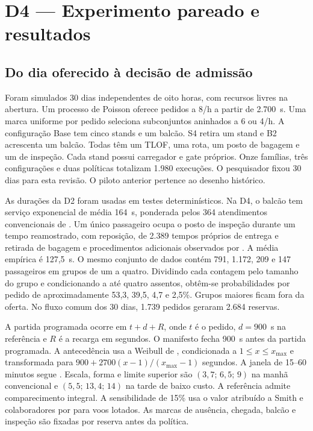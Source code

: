 \section{D4 — Experimento pareado e resultados}
\label{sec:resultados}
\subsection{Do dia oferecido à decisão de admissão}
Foram simulados 30 dias independentes de oito horas, com recursos livres na abertura. Um processo de Poisson oferece pedidos a 8/h a partir de 2.700~s. Uma marca uniforme por pedido seleciona subconjuntos aninhados a 6 ou 4/h. A configuração Base tem cinco stands e um balcão. S4 retira um stand e B2 acrescenta um balcão. Todas têm um TLOF, uma rota, um posto de bagagem e um de inspeção. Cada stand possui carregador e gate próprios. Onze famílias, três configurações e duas políticas totalizam 1.980 execuções. O pesquisador fixou 30 dias para esta revisão. O piloto anterior pertence ao desenho histórico.

As durações da D2 foram usadas em testes determinísticos. Na D4, o balcão tem serviço exponencial de média 164~s, ponderada pelos 364 atendimentos convencionais de \citet{marintseva2014}. Um único passageiro ocupa o posto de inspeção durante um tempo reamostrado, com reposição, de 2.389 tempos próprios de entrega e retirada de bagagem e procedimentos adicionais observados por \citet{janssen2020security}. A média empírica é 127,5~s. O mesmo conjunto de dados contém 791, 1.172, 209 e 147 passageiros em grupos de um a quatro. Dividindo cada contagem pelo tamanho do grupo e condicionando a até quatro assentos, obtêm-se probabilidades por pedido de aproximadamente 53,3, 39,5, 4,7 e 2,5\%. Grupos maiores ficam fora da oferta. No fluxo comum dos 30 dias, 1.739 pedidos geraram 2.684 reservas.

A partida programada ocorre em $t+d+R$, onde $t$ é o pedido, $d=900$~s na referência e $R$ é a recarga em segundos. O manifesto fecha 900~s antes da partida programada. A antecedência usa a Weibull de \citet{postorino2019}, condicionada a $1\leq x\leq x_{\max}$ e transformada para $900+2700(x-1)/(x_{\max}-1)$ segundos. A janela de 15--60 minutos segue \citet{feldhoff2022}. Escala, forma e limite superior são $(3{,}7;\,6{,}5;\,9)$ na manhã convencional e $(5{,}5;\,13{,}4;\,14)$ na tarde de baixo custo. A referência admite comparecimento integral. A sensibilidade de 15\% usa o valor atribuído a Smith e colaboradores por \citet{vojtek2021} para voos lotados. As marcas de ausência, chegada, balcão e inspeção são fixadas por reserva antes da política.


